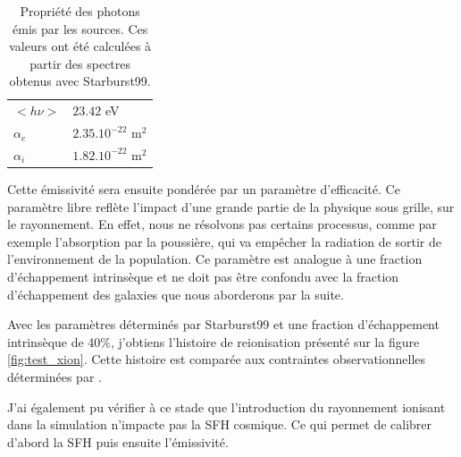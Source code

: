 \begin{table}
\begin{tabular}{l l }
	$<h\nu>$	&  $23.42$ eV \\
	$\alpha_e$	&  $2.35.10^{-22}$ m$^2$ \\
	$\alpha_i$	&  $1.82.10^{-22}$ m$^2$ \\
\end{tabular}
\caption{Propriété des photons émis par les sources.
Ces valeurs ont été calculées à partir des spectres obtenus avec Starburst99.
\label{tab_photon}}
\end{table}

Cette émissivité sera ensuite pondérée par un paramètre d'efficacité.
Ce paramètre libre reflète l'impact d'une grande partie de la physique sous grille, sur le rayonnement.
En effet, nous ne résolvons pas certains processus, comme par exemple l'absorption par la poussière, qui va empêcher la radiation de sortir de l’environnement de la population.
Ce paramètre est analogue à une fraction d'échappement intrinsèque et ne doit pas être confondu avec la fraction d'échappement des galaxies que nous aborderons par la suite. %

Avec les paramètres déterminés par Starburst99 et une fraction d'échappement intrinsèque de 40\%, j'obtiens l'histoire de reionisation présenté sur la figure \ref{fig:test_xion}.
Cette histoire est comparée aux contraintes observationnelles déterminées par \cite{fan_constraining_2006}.

J'ai également pu vérifier à ce stade que l'introduction du rayonnement ionisant dans la simulation n'impacte pas la \ac{SFH} cosmique.
Ce qui permet de calibrer d'abord la \ac{SFH} puis ensuite l'émissivité.






%


